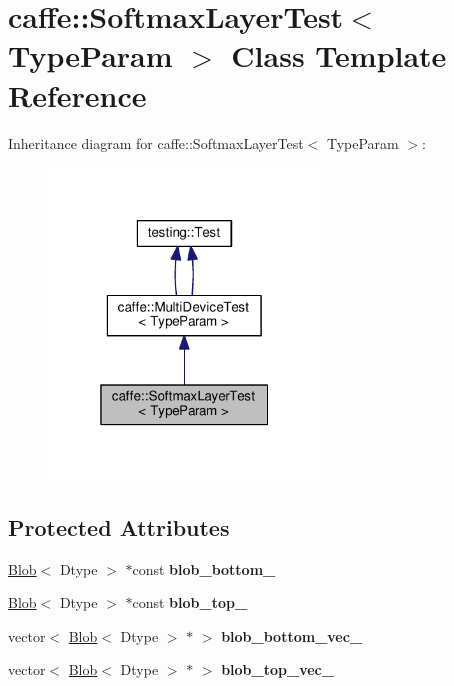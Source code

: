 \hypertarget{classcaffe_1_1_softmax_layer_test}{}\section{caffe\+:\+:Softmax\+Layer\+Test$<$ Type\+Param $>$ Class Template Reference}
\label{classcaffe_1_1_softmax_layer_test}


Inheritance diagram for caffe\+:\+:Softmax\+Layer\+Test$<$ Type\+Param $>$\+:
\nopagebreak
\begin{figure}[H]
\begin{center}
\leavevmode
\includegraphics[width=205pt]{classcaffe_1_1_softmax_layer_test__inherit__graph}
\end{center}
\end{figure}
\subsection*{Protected Attributes}
\begin{DoxyCompactItemize}
\item 
\mbox{\label{classcaffe_1_1_softmax_layer_test_aead2a03a388ce1bc1206a27c99177cd1}} 
\mbox{\hyperlink{classcaffe_1_1_blob}{Blob}}$<$ Dtype $>$ $\ast$const {\bfseries blob\+\_\+bottom\+\_\+}
\item 
\mbox{\label{classcaffe_1_1_softmax_layer_test_a4557abde04aa78c3f177d0f8644ba4a2}} 
\mbox{\hyperlink{classcaffe_1_1_blob}{Blob}}$<$ Dtype $>$ $\ast$const {\bfseries blob\+\_\+top\+\_\+}
\item 
\mbox{\label{classcaffe_1_1_softmax_layer_test_ad4dc467b1cc74521adff9146b2744b01}} 
vector$<$ \mbox{\hyperlink{classcaffe_1_1_blob}{Blob}}$<$ Dtype $>$ $\ast$ $>$ {\bfseries blob\+\_\+bottom\+\_\+vec\+\_\+}
\item 
\mbox{\label{classcaffe_1_1_softmax_layer_test_a6f939fa21e76f9c62ee2f429c866697c}} 
vector$<$ \mbox{\hyperlink{classcaffe_1_1_blob}{Blob}}$<$ Dtype $>$ $\ast$ $>$ {\bfseries blob\+\_\+top\+\_\+vec\+\_\+}
\end{DoxyCompactItemize}
